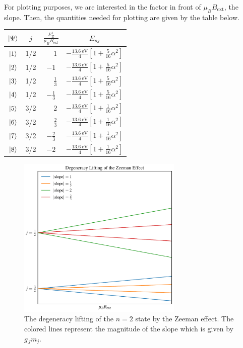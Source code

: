 \documentclass[a4paper, 12pt]{config/homework}
\begin{document}
\begin{enumerate}
\pagebreak
For plotting purposes, we are interested in the factor in front of \(\mu_B B_\text{ext}\), the slope. Then, the quantities needed for plotting are given by the table below.
\begin{table}[h]
\centering
\begin{tabular}{c|ccc}
\(\ket*{\Psi}\) & \(j\) & \(\frac{E_Z^1}{\mu_B B_\text{ext}}\) & \(E_{nj}\)                                                        \\ \hline
\(\ket*{1}\) & 1/2 & \(\phantom{-}1\) & \(-\frac{\qty{13.6}{\eV}}{4}\left[1+\frac{5}{16}\alpha^2\right]\) \\
\(\ket*{2}\) & 1/2 & \(-1\) & \(-\frac{\qty{13.6}{\eV}}{4}\left[1+\frac{5}{16}\alpha^2\right]\) \\
\(\ket*{3}\) & 1/2 & \(\phantom{-}\frac{1}{3}\) & \(-\frac{\qty{13.6}{\eV}}{4}\left[1+\frac{5}{16}\alpha^2\right]\) \\
\(\ket*{4}\) & 1/2 & \(-\frac{1}{3}\) & \(-\frac{\qty{13.6}{\eV}}{4}\left[1+\frac{5}{16}\alpha^2\right]\) \\
\(\ket*{5}\) & 3/2 & \(\phantom{-}2\) & \(-\frac{\qty{13.6}{\eV}}{4}\left[1+\frac{1}{16}\alpha^2\right]\) \\
\(\ket*{6}\) & 3/2 & \(\phantom{-}\frac{2}{3}\) & \(-\frac{\qty{13.6}{\eV}}{4}\left[1+\frac{1}{16}\alpha^2\right]\) \\
\(\ket*{7}\) & 3/2 & \(-\frac{2}{3}\) & \(-\frac{\qty{13.6}{\eV}}{4}\left[1+\frac{1}{16}\alpha^2\right]\) \\
\(\ket*{8}\) & 3/2 & \(-2\) & \(-\frac{\qty{13.6}{\eV}}{4}\left[1+\frac{1}{16}\alpha^2\right]\)
\end{tabular}
\end{table}

\begin{figure}[H]
\centering
\includegraphics[width=0.7\textwidth]{notebooks/figures/energy_degeneracy_lifting.pdf}
\caption{The degeneracy lifting of the \(n=2\) state by the Zeeman effect. The colored lines represent the magnitude of the slope which is given by \(g_Jm_j\).}
\label{fig:degen}
\end{figure}

\end{enumerate}
\end{document}
